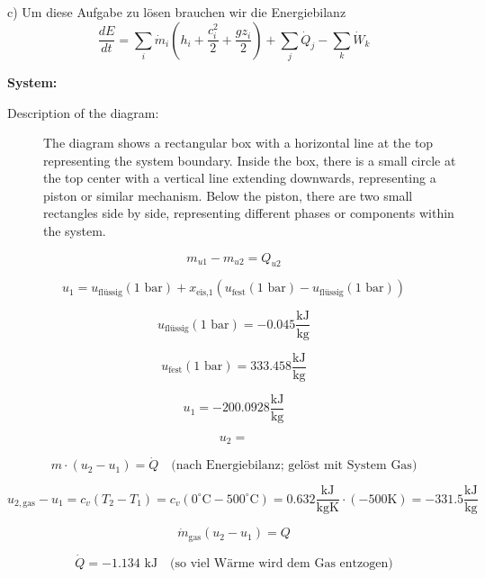 c) Um diese Aufgabe zu lösen brauchen wir die Energiebilanz
\[
\frac{dE}{dt} = \sum_i \dot{m}_i \left( h_i + \frac{c_i^2}{2} + \frac{g z_i}{2} \right) + \sum_j \dot{Q}_j - \sum_k \dot{W}_k
\]

\textbf{System:}

\begin{description}
    \item[Description of the diagram:] The diagram shows a rectangular box with a horizontal line at the top representing the system boundary. Inside the box, there is a small circle at the top center with a vertical line extending downwards, representing a piston or similar mechanism. Below the piston, there are two small rectangles side by side, representing different phases or components within the system.
\end{description}

\[
m_{u1} - m_{u2} = Q_{u2}
\]

\[
u_1 = u_{\text{flüssig}} (1 \text{ bar}) + x_{\text{eis,1}} \left( u_{\text{fest}} (1 \text{ bar}) - u_{\text{flüssig}} (1 \text{ bar}) \right)
\]

\[
u_{\text{flüssig}} (1 \text{ bar}) = -0.045 \frac{\text{kJ}}{\text{kg}}
\]

\[
u_{\text{fest}} (1 \text{ bar}) = 333.458 \frac{\text{kJ}}{\text{kg}}
\]

\[
u_1 = -200.0928 \frac{\text{kJ}}{\text{kg}}
\]

\[
u_2 = 
\]

\[
m \cdot (u_2 - u_1) = \dot{Q} \quad \text{(nach Energiebilanz; gelöst mit System Gas)}
\]

\[
u_{2,\text{gas}} - u_1 = c_v (T_2 - T_1) = c_v (0^\circ \text{C} - 500^\circ \text{C}) = 0.632 \frac{\text{kJ}}{\text{kgK}} \cdot (-500 \text{K}) = -331.5 \frac{\text{kJ}}{\text{kg}}
\]

\[
\dot{m}_{\text{gas}} (u_2 - u_1) = Q
\]

\[
\dot{Q} = -1.134 \text{ kJ} \quad \text{(so viel Wärme wird dem Gas entzogen)}
\]